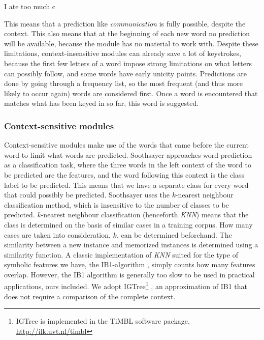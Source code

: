 \documentclass[12pt]{article}
\begin{document}
\begin{examples}
\item I ate too much c \label{only_c}
\end{examples}

This means that a prediction like \emph{communication} is fully possible, despite the context. This also means that at the beginning of each new word no prediction will be available, because the module has no material to work with. Despite these limitations, context-insensitive modules can already save a lot of keystrokes, because the first few letters of a word impose strong limitations on what letters can possibly follow, and some words have early unicity points. Predictions are done by going through a frequency list, so the most frequent (and thus more likely to occur again) words are considered first. Once a word is encountered that matches what has been keyed in so far, this word is suggested.

\subsubsection{Context-sensitive modules} \label{cs}

Context-sensitive modules make use of the words that came before the current word to limit what words are predicted. Soothsayer approaches word prediction as a classification task, where the three words in the left context of the word to be predicted are the features, and the word following this context is the class label to be predicted. This means that we have a separate class for every word that could possibly be predicted. Soothsayer uses the $k$-nearest neighbour classification method, which is insensitive to the number of classes to be predicted. $k$-nearest neighbour classification (henceforth \emph{KNN}) means that the class is determined on the basis of similar cases in a training corpus. How many cases are taken into consideration, $k$, can be determined beforehand. The similarity between a new instance and memorized instances is determined using a similarity function.  A classic implementation of \emph{KNN} suited for the type of symbolic features we have, the IB1-algorithm \cite{aha+91}, simply counts how many features overlap. However, the IB1 algorithm is generally too slow to be used in practical applications, ours included. We adopt IGTree\footnote{IGTree is implemented in the TiMBL software package, \url{http://ilk.uvt.nl/timbl}} \cite{daelemans+97}, an approximation of IB1 that does not require a comparison of the complete context.
\end{document}
